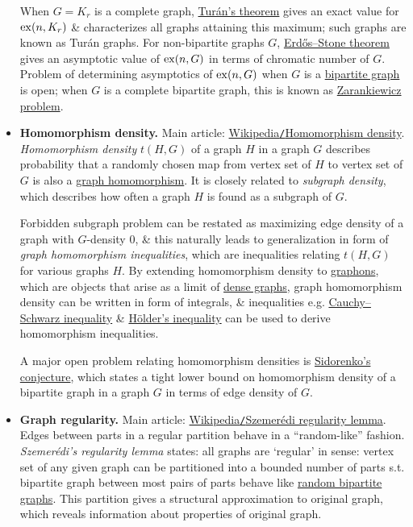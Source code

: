 \documentclass{article}
\begin{document}
\begin{itemize}
	When $G = K_r$ is a complete graph, \href{https://en.wikipedia.org/wiki/Tur%C3%A1n%27s_theorem}{Tur\'an's theorem} gives an exact value for ${\rm ex}(n,K_r)$ \& characterizes all graphs attaining this maximum; such graphs are known as Tur\'an graphs. For non-bipartite graphs $G$, \href{https://en.wikipedia.org/wiki/Erd%C5%91s%E2%80%93Stone_theorem}{Erd\H{o}s--Stone theorem} gives an asymptotic value of ${\rm ex}(n,G)$ in terms of chromatic number of $G$. Problem of determining asymptotics of ${\rm ex}(n,G)$ when $G$ is a \href{https://en.wikipedia.org/wiki/Bipartite_graph}{bipartite graph} is open; when $G$ is a complete bipartite graph, this is known as \href{https://en.wikipedia.org/wiki/Zarankiewicz_problem}{Zarankiewicz problem}.
	\item {\bf Homomorphism density.} Main article: \href{https://en.wikipedia.org/wiki/Homomorphism_density}{Wikipedia{\tt/}Homomorphism density}. {\it Homomorphism density} $t(H,G)$ of a graph $H$ in a graph $G$ describes probability that a randomly chosen map from vertex set of $H$ to vertex set of $G$ is also a \href{https://en.wikipedia.org/wiki/Graph_homomorphism}{graph homomorphism}. It is closely related to {\it subgraph density}, which describes how often a graph $H$ is found as a subgraph of $G$.
	
	Forbidden subgraph problem can be restated as maximizing edge density of a graph with $G$-density 0, \& this naturally leads to generalization in form of {\it graph homomorphism inequalities}, which are inequalities relating $t(H,G)$ for various graphs $H$. By extending homomorphism density to \href{https://en.wikipedia.org/wiki/Graphon}{graphons}, which are objects that arise as a limit of \href{https://en.wikipedia.org/wiki/Dense_graph}{dense graphs}, graph homomorphism density can be written in form of integrals, \& inequalities e.g. \href{https://en.wikipedia.org/wiki/Cauchy-Schwarz_inequality}{Cauchy--Schwarz inequality} \& \href{https://en.wikipedia.org/wiki/H%C3%B6lder%27s_inequality}{H\"older's inequality} can be used to derive homomorphism inequalities.
	
	A major open problem relating homomorphism densities is \href{https://en.wikipedia.org/wiki/Sidorenko%27s_conjecture}{Sidorenko's conjecture}, which states a tight lower bound on homomorphism density of a bipartite graph in a graph $G$ in terms of edge density of $G$.
	\item {\bf Graph regularity.} Main article: \href{https://en.wikipedia.org/wiki/Szemer%C3%A9di_regularity_lemma}{Wikipedia{\tt/}Szemerédi regularity lemma}. {\sf Edges between parts in a regular partition behave in a ``random-like'' fashion.} {\it Szemerédi's regularity lemma} states: all graphs are `regular' in sense: vertex set of any given graph can be partitioned into a bounded number of parts s.t. bipartite graph between most pairs of parts behave like \href{https://en.wikipedia.org/wiki/Random_graph}{random bipartite graphs}. This partition gives a structural approximation to original graph, which reveals information about properties of original graph.
	

\end{itemize}
\end{document}
